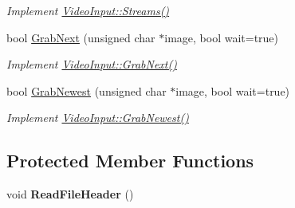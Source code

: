 \begin{DoxyCompactItemize}
\begin{DoxyCompactList}\small\item\em Implement \hyperlink{structpangolin_1_1_video_input_a9030d775d699c39ab7b7ba378c007c6a}{Video\+Input\+::\+Streams()} \end{DoxyCompactList}\item 
bool \hyperlink{classpangolin_1_1_pvn_video_abbe2e6f77a226c520fc40a79c443ba81}{Grab\+Next} (unsigned char $\ast$image, bool wait=true)\hypertarget{classpangolin_1_1_pvn_video_abbe2e6f77a226c520fc40a79c443ba81}{}\label{classpangolin_1_1_pvn_video_abbe2e6f77a226c520fc40a79c443ba81}

\begin{DoxyCompactList}\small\item\em Implement \hyperlink{structpangolin_1_1_video_input_ad3d8ff59c1ec4139320097e6e1111f32}{Video\+Input\+::\+Grab\+Next()} \end{DoxyCompactList}\item 
bool \hyperlink{classpangolin_1_1_pvn_video_abe3e1aa11b6ebb46842fae10cee2aa97}{Grab\+Newest} (unsigned char $\ast$image, bool wait=true)\hypertarget{classpangolin_1_1_pvn_video_abe3e1aa11b6ebb46842fae10cee2aa97}{}\label{classpangolin_1_1_pvn_video_abe3e1aa11b6ebb46842fae10cee2aa97}

\begin{DoxyCompactList}\small\item\em Implement \hyperlink{structpangolin_1_1_video_input_a4c8ac38e3c6a3f591663aeebf645e4c6}{Video\+Input\+::\+Grab\+Newest()} \end{DoxyCompactList}\end{DoxyCompactItemize}
\subsection*{Protected Member Functions}
\begin{DoxyCompactItemize}
\item 
void {\bfseries Read\+File\+Header} ()\hypertarget{classpangolin_1_1_pvn_video_af288a0b4427f1fafd7ade0619771591f}{}\label{classpangolin_1_1_pvn_video_af288a0b4427f1fafd7ade0619771591f}

\end{DoxyCompactItemize}

